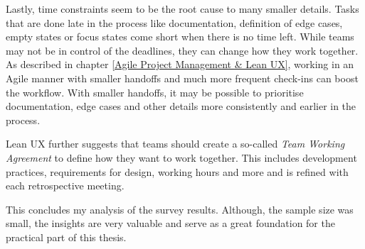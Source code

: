 Lastly, time constraints seem to be the root cause to many smaller details. Tasks that are done late
in the process like documentation, definition of edge cases, empty states or focus states come short
when there is no time left. While teams may not be in control of the deadlines, they can change how
they work together. As described in chapter \ref{Agile Project Management & Lean UX}, working in an
Agile manner with smaller handoffs and much more frequent check-ins can boost the workflow. With
smaller handoffs, it may be possible to prioritise documentation, edge cases and other details more
consistently and earlier in the process.

Lean UX further suggests that teams should create a so-called \textit{Team Working Agreement} to
define how they want to work together. This includes development practices, requirements for design,
working hours and more and is refined with each retrospective meeting.


This concludes my analysis of the survey results. Although, the sample size was small, the insights
are very valuable and serve as a great foundation for the practical part of this thesis.
